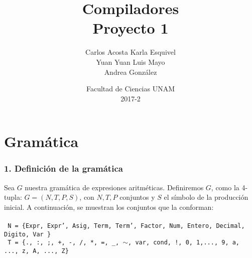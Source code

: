 \documentclass[12pt]{article}
\title{Compiladores\\ Proyecto 1}
\author{Carlos Acosta \qquad Karla Esquivel \\ Yuan Yuan \qquad Luis Mayo \\ Andrea González}
\date{Facultad de Ciencias UNAM \\ 2017-2}
\begin{document}
\maketitle
\section*{Gramática}
\subsubsection*{1. Definición de la gramática}

Sea $G$ nuestra gramática de expresiones aritméticas. Definiremos $G$, como la 4-tupla: $G = (N,T,P,S)$, con $N,T,P$ conjuntos y $S$ el símbolo de la producción inicial.
A continuación, se muestran los conjuntos que la conforman:\\ \\
\texttt{ 
N = \{Expr, Expr', Asig, Term, Term', Factor, Num, Entero, Decimal, Digito, Var \}
}\\
\texttt{
T = \{., :, ;, +, -, /, *, =, \_, $\sim$, var, cond, !, 0, 1,..., 9, a, ..., z, A, ..., Z\}
}\\
\end{document}
